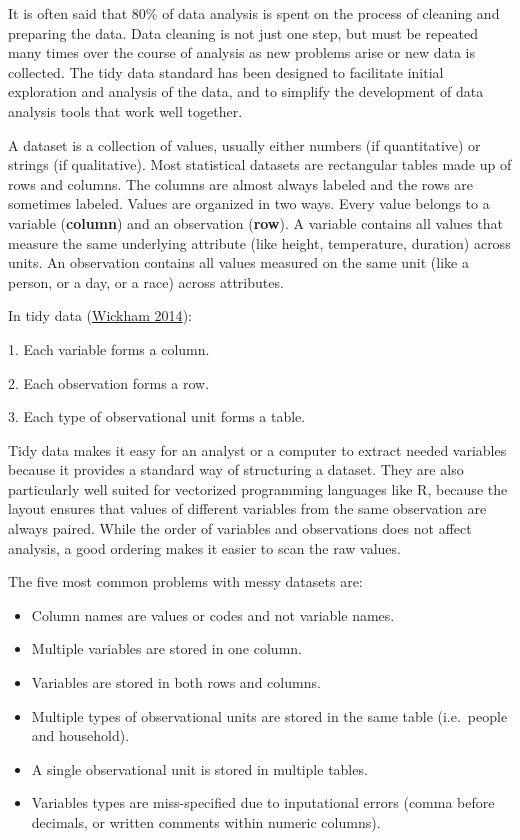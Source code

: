 \documentclass[
]{svmono}
\begin{document}
It is often said that 80\% of data analysis is spent on the process of
cleaning and preparing the data. Data cleaning is not just one step, but
must be repeated many times over the course of analysis as new problems
arise or new data is collected. The tidy data standard has been designed
to facilitate initial exploration and analysis of the data, and to
simplify the development of data analysis tools that work well together.

A dataset is a collection of values, usually either numbers (if
quantitative) or strings (if qualitative). Most statistical datasets are
rectangular tables made up of rows and columns. The columns are almost
always labeled and the rows are sometimes labeled. Values are organized
in two ways. Every value belongs to a variable (\textbf{column}) and an
observation (\textbf{row}). A variable contains all values that measure the
same underlying attribute (like height, temperature, duration) across
units. An observation contains all values measured on the same unit
(like a person, or a day, or a race) across attributes.

In tidy data (\protect\hyperlink{ref-wickham2014}{Wickham 2014}):

1. Each variable forms a column.

2. Each observation forms a row.

3. Each type of observational unit forms a table.

Tidy data makes it easy for an analyst or a computer to extract needed
variables because it provides a standard way of structuring a dataset.
They are also particularly well suited for vectorized programming
languages like R, because the layout ensures that values of different
variables from the same observation are always paired. While the order
of variables and observations does not affect analysis, a good ordering
makes it easier to scan the raw values.

The five most common problems with messy datasets are:

\begin{itemize}
\item
  Column names are values or codes and not variable names.
\item
  Multiple variables are stored in one column.
\item
  Variables are stored in both rows and columns.
\item
  Multiple types of observational units are stored in the same table
  (i.e.~people and household).
\item
  A single observational unit is stored in multiple tables.
\item
  Variables types are miss-specified due to inputational errors (comma
  before decimals, or written comments within numeric columns).
\end{itemize}
\end{document}

